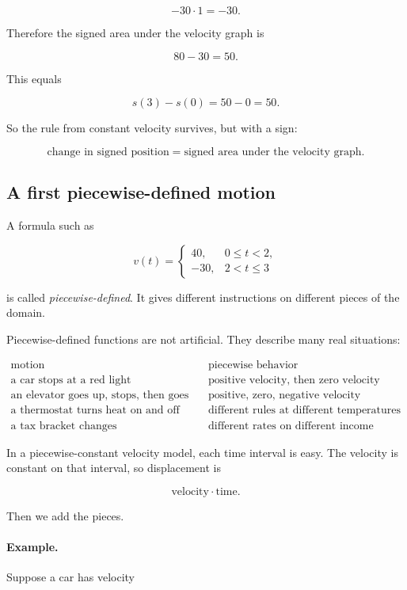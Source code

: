 \[
-30\cdot 1=-30.
\]

Therefore the signed area under the velocity graph is

\[
80-30=50.
\]

This equals

\[
s(3)-s(0)=50-0=50.
\]

So the rule from constant velocity survives, but with a sign:

\[
\boxed{\text{change in signed position}=\text{signed area under the velocity graph}.}
\]

\subsection{A first piecewise-defined motion}

A formula such as

\[
v(t)=
\begin{cases}
40, & 0\leq t<2,\\
-30, & 2<t\leq 3
\end{cases}
\]

is called \emph{piecewise-defined}. It gives different instructions on different pieces of the domain.

Piecewise-defined functions are not artificial. They describe many real situations:

\[
\begin{array}{c|c}
\text{motion} & \text{piecewise behavior} \\ \hline
\text{a car stops at a red light} & \text{positive velocity, then zero velocity} \\
\text{an elevator goes up, stops, then goes down} & \text{positive, zero, negative velocity} \\
\text{a thermostat turns heat on and off} & \text{different rules at different temperatures} \\
\text{a tax bracket changes} & \text{different rates on different income intervals}
\end{array}
\]

In a piecewise-constant velocity model, each time interval is easy. The velocity is constant on that interval, so displacement is

\[
\text{velocity}\cdot \text{time}.
\]

Then we add the pieces.

\paragraph{Example.}
Suppose a car has velocity

